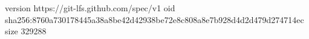 version https://git-lfs.github.com/spec/v1
oid sha256:8760a730178445a38a8be42d42938be72e8c808a8e7b928d4d2d479d274714ec
size 329288
